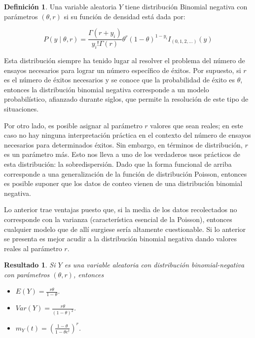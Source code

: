 \documentclass[
  spanish,
]{book}
\providecommand{\tightlist}{%
  \setlength{\itemsep}{0pt}\setlength{\parskip}{0pt}}
\newtheorem{proposition}{Resultado}[chapter]
\theoremstyle{definition}
\newtheorem{definition}{Definición}[chapter]
\theoremstyle{definition}
\theoremstyle{definition}
\theoremstyle{definition}
\theoremstyle{remark}
\begin{document}
\begin{definition}
\protect\hypertarget{def:unnamed-chunk-11}{}{\label{def:unnamed-chunk-11} }Una variable aleatoria \(Y\) tiene distribución Binomial negativa con parámetros \((\theta, r)\) si su función de densidad está dada por:

\begin{equation}
P(y\mid \theta, r)=\frac{\Gamma(r+y_i)}{y_i!\Gamma(r)}\theta^r(1-\theta)^{1-y_i}I_{(0,1,2,\ldots)}(y)
\end{equation}
\end{definition}

Esta distribución siempre ha tenido lugar al resolver el problema del número de ensayos necesarios para lograr un número específico de éxitos. Por supuesto, si \(r\) es el número de éxitos necesarios y se conoce que la probabilidad de éxito es \(\theta\), entonces la distribución binomial negativa corresponde a un modelo probabilístico, afianzado durante siglos, que permite la resolución de este tipo de situaciones.

Por otro lado, es posible asignar al parámetro \(r\) valores que sean reales; en este caso no hay ninguna interpretación práctica en el contexto del número de ensayos necesarios para determinados éxitos. Sin embargo, en términos de distribución, \(r\) es un parámetro más. Esto nos lleva a uno de los verdaderos usos prácticos de esta distribución: la sobredispersión. Dado que la forma funcional de arriba corresponde a una generalización de la función de distribución Poisson, entonces es posible suponer que los datos de conteo vienen de una distribución binomial negativa.

Lo anterior trae ventajas puesto que, si la media de los datos recolectados no corresponde con la varianza (característica esencial de la Poisson), entonces cualquier modelo que de allí surgiese sería altamente cuestionable. Si lo anterior se presenta es mejor acudir a la distribución binomial negativa dando valores reales al parámetro \(r\).

\begin{proposition}
\protect\hypertarget{prp:unnamed-chunk-12}{}{\label{prp:unnamed-chunk-12} }Si \(Y\) es una variable aleatoria con distribución binomial-negativa con parámetros \((\theta, r)\), entonces

\begin{itemize}
\tightlist
\item
  \(E(Y)=\frac{r\theta}{1-\theta}\).
\item
  \(Var(Y)=\frac{r\theta}{(1-\theta)^2}\).
\item
  \(m_Y(t)=\left(\frac{1-\theta}{1-\theta e^t}\right)^r\).
\end{itemize}
\end{proposition}
\end{document}
